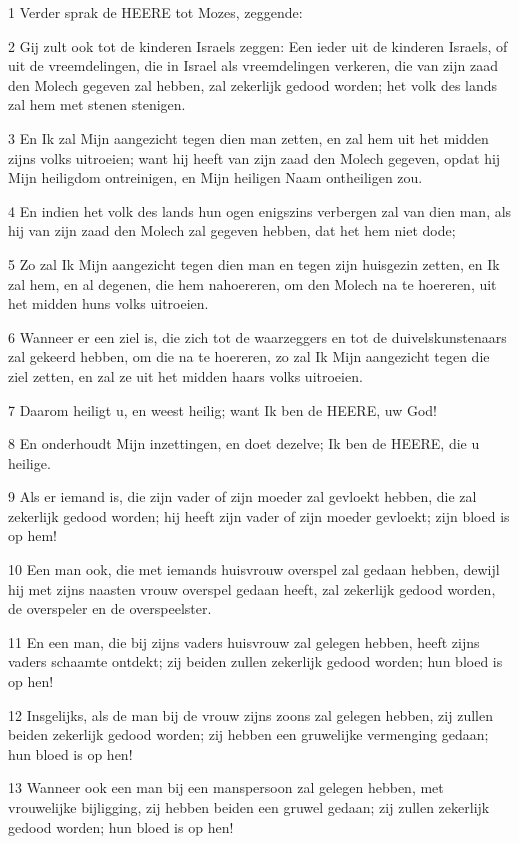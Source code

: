 \par 1 Verder sprak de HEERE tot Mozes, zeggende:
\par 2 Gij zult ook tot de kinderen Israels zeggen: Een ieder uit de kinderen Israels, of uit de vreemdelingen, die in Israel als vreemdelingen verkeren, die van zijn zaad den Molech gegeven zal hebben, zal zekerlijk gedood worden; het volk des lands zal hem met stenen stenigen.
\par 3 En Ik zal Mijn aangezicht tegen dien man zetten, en zal hem uit het midden zijns volks uitroeien; want hij heeft van zijn zaad den Molech gegeven, opdat hij Mijn heiligdom ontreinigen, en Mijn heiligen Naam ontheiligen zou.
\par 4 En indien het volk des lands hun ogen enigszins verbergen zal van dien man, als hij van zijn zaad den Molech zal gegeven hebben, dat het hem niet dode;
\par 5 Zo zal Ik Mijn aangezicht tegen dien man en tegen zijn huisgezin zetten, en Ik zal hem, en al degenen, die hem nahoereren, om den Molech na te hoereren, uit het midden huns volks uitroeien.
\par 6 Wanneer er een ziel is, die zich tot de waarzeggers en tot de duivelskunstenaars zal gekeerd hebben, om die na te hoereren, zo zal Ik Mijn aangezicht tegen die ziel zetten, en zal ze uit het midden haars volks uitroeien.
\par 7 Daarom heiligt u, en weest heilig; want Ik ben de HEERE, uw God!
\par 8 En onderhoudt Mijn inzettingen, en doet dezelve; Ik ben de HEERE, die u heilige.
\par 9 Als er iemand is, die zijn vader of zijn moeder zal gevloekt hebben, die zal zekerlijk gedood worden; hij heeft zijn vader of zijn moeder gevloekt; zijn bloed is op hem!
\par 10 Een man ook, die met iemands huisvrouw overspel zal gedaan hebben, dewijl hij met zijns naasten vrouw overspel gedaan heeft, zal zekerlijk gedood worden, de overspeler en de overspeelster.
\par 11 En een man, die bij zijns vaders huisvrouw zal gelegen hebben, heeft zijns vaders schaamte ontdekt; zij beiden zullen zekerlijk gedood worden; hun bloed is op hen!
\par 12 Insgelijks, als de man bij de vrouw zijns zoons zal gelegen hebben, zij zullen beiden zekerlijk gedood worden; zij hebben een gruwelijke vermenging gedaan; hun bloed is op hen!
\par 13 Wanneer ook een man bij een manspersoon zal gelegen hebben, met vrouwelijke bijligging, zij hebben beiden een gruwel gedaan; zij zullen zekerlijk gedood worden; hun bloed is op hen!
